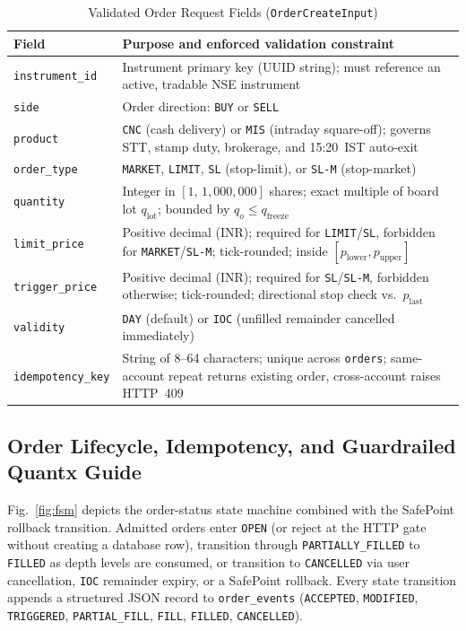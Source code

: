 \documentclass[journal,onecolumn,10pt]{IEEEtran}
\begin{document}
\begin{table}[!t]
\caption{Validated Order Request Fields (\texttt{OrderCreateInput})}
\label{tab:fields}
\centering
\small
\renewcommand{\arraystretch}{1.12}
\begin{tabularx}{\textwidth}{@{}>{\raggedright\arraybackslash}p{1.35in}X@{}}
\toprule
Field & Purpose and enforced validation constraint \\
\midrule
\texttt{instrument\_id} & Instrument primary key (UUID string); must reference an active, tradable NSE instrument \\
\texttt{side} & Order direction: \texttt{BUY} or \texttt{SELL} \\
\texttt{product} & \texttt{CNC} (cash delivery) or \texttt{MIS} (intraday square-off); governs STT, stamp duty, brokerage, and 15:20~IST auto-exit \\
\texttt{order\_type} & \texttt{MARKET}, \texttt{LIMIT}, \texttt{SL} (stop-limit), or \texttt{SL-M} (stop-market) \\
\texttt{quantity} & Integer in $[1,\,1{,}000{,}000]$ shares; exact multiple of board lot $q_{\mathrm{lot}}$; bounded by $q_o \le q_{\mathrm{freeze}}$ \\
\texttt{limit\_price} & Positive decimal (INR); required for \texttt{LIMIT}/\texttt{SL}, forbidden for \texttt{MARKET}/\texttt{SL-M}; tick-rounded; inside $[p_{\mathrm{lower}}, p_{\mathrm{upper}}]$ \\
\texttt{trigger\_price} & Positive decimal (INR); required for \texttt{SL}/\texttt{SL-M}, forbidden otherwise; tick-rounded; directional stop check vs.\ $p_{\mathrm{last}}$ \\
\texttt{validity} & \texttt{DAY} (default) or \texttt{IOC} (unfilled remainder cancelled immediately) \\
\texttt{idempotency\_key} & String of 8--64 characters; unique across \texttt{orders}; same-account repeat returns existing order, cross-account raises HTTP~409 \\
\bottomrule
\end{tabularx}
\end{table}

\subsection{Order Lifecycle, Idempotency, and Guardrailed Quantx Guide}
Fig.~\ref{fig:fsm} depicts the order-status state machine combined with the SafePoint rollback transition. Admitted orders enter \texttt{OPEN} (or reject at the HTTP gate without creating a database row), transition through \texttt{PARTIALLY\_FILLED} to \texttt{FILLED} as depth levels are consumed, or transition to \texttt{CANCELLED} via user cancellation, \texttt{IOC} remainder expiry, or a SafePoint rollback. Every state transition appends a structured JSON record to \texttt{order\_events} (\texttt{ACCEPTED}, \texttt{MODIFIED}, \texttt{TRIGGERED}, \texttt{PARTIAL\_FILL}, \texttt{FILL}, \texttt{FILLED}, \texttt{CANCELLED}).
\end{document}
